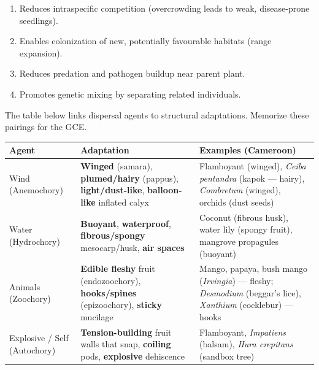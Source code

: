 \documentclass[11pt]{article}
\begin{document}
\begin{propriete}
\begin{enumerate}
\item Reduces intraspecific competition (overcrowding leads to weak, disease-prone seedlings).
\item Enables colonization of new, potentially favourable habitats (range expansion).
\item Reduces predation and pathogen buildup near parent plant.
\item Promotes genetic mixing by separating related individuals.
\end{enumerate}
\end{propriete}

The table below links dispersal agents to structural adaptations. Memorize these pairings for the GCE.

\begin{center}
\begin{tabularx}{\linewidth}{|l|X|X|}\hline
\rowcolor{popblueL} \textbf{Agent} & \textbf{Adaptation} & \textbf{Examples (Cameroon)} \\ \hline
Wind (Anemochory) & \textbf{Winged} (samara), \textbf{plumed/hairy} (pappus), \textbf{light/dust-like}, \textbf{balloon-like} inflated calyx & Flamboyant (winged), \emph{Ceiba pentandra} (kapok — hairy), \emph{Combretum} (winged), orchids (dust seeds) \\ \hline
Water (Hydrochory) & \textbf{Buoyant}, \textbf{waterproof}, \textbf{fibrous/spongy} mesocarp/husk, \textbf{air spaces} & Coconut (fibrous husk), water lily (spongy fruit), mangrove propagules (buoyant) \\ \hline
Animals (Zoochory) & \textbf{Edible fleshy} fruit (endozoochory), \textbf{hooks/spines} (epizoochory), \textbf{sticky} mucilage & Mango, papaya, bush mango (\emph{Irvingia}) — fleshy; \emph{Desmodium} (beggar's lice), \emph{Xanthium} (cocklebur) — hooks \\ \hline
Explosive / Self (Autochory) & \textbf{Tension-building} fruit walls that snap, \textbf{coiling} pods, \textbf{explosive} dehiscence & Flamboyant, \emph{Impatiens} (balsam), \emph{Hura crepitans} (sandbox tree) \\ \hline
\end{tabularx}
\end{center}
\end{document}
